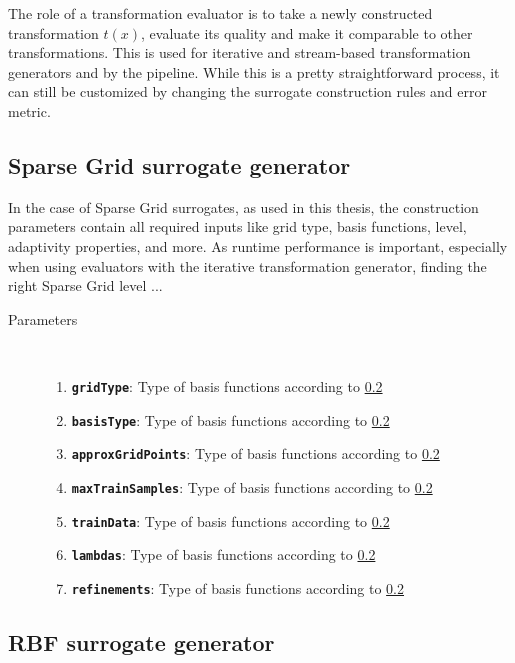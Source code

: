 \documentclass[
  a4paper,  %
  twoside,  %
  bibliography=totoc,
  headsepline,
  cleardoublepage=empty,
  parskip=half,
  draft=false
]{scrbook}
\begin{document}
The role of a transformation evaluator is to take a newly constructed transformation $t(x)$, evaluate its quality and make it comparable to other transformations.
This is used for iterative and stream-based transformation generators and by the pipeline.
While this is a pretty straightforward process, it can still be customized by changing the surrogate construction rules and error metric.


\subsection {Sparse Grid surrogate generator}

In the case of Sparse Grid surrogates, as used in this thesis, the construction parameters contain all required inputs like grid type, basis functions, level, adaptivity properties, and more.
As runtime performance is important, especially when using evaluators with the iterative transformation generator, finding the right Sparse Grid level ...

\begin{mdframed}[linewidth=0.7px]
\begin{description}
\item[Parameters] {~ \begin{enumerate}[\indent{}]
\item \texttt{\textbf{gridType}}: Type of basis functions according to \ref{}
\item \texttt{\textbf{basisType}}: Type of basis functions according to \ref{}
\item \texttt{\textbf{approxGridPoints}}: Type of basis functions according to \ref{}
\item \texttt{\textbf{maxTrainSamples}}: Type of basis functions according to \ref{}
\item \texttt{\textbf{trainData}}: Type of basis functions according to \ref{}
\item \texttt{\textbf{lambdas}}: Type of basis functions according to \ref{}
\item \texttt{\textbf{refinements}}: Type of basis functions according to \ref{}
\end{enumerate}}
\end{description}
\end{mdframed}

\subsection {RBF surrogate generator}
\end{document}
